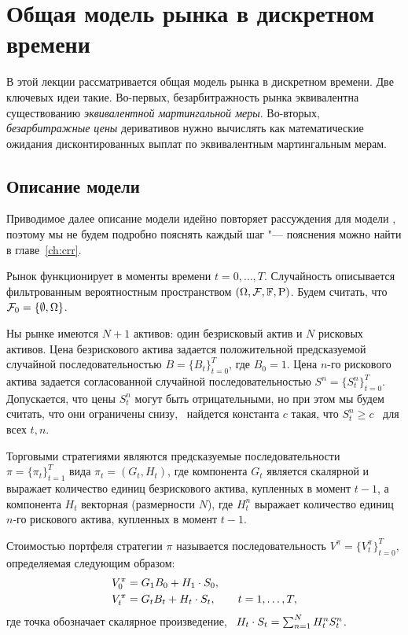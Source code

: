 \chapter{Общая модель рынка в дискретном времени}
\label{ch:general}
\chaptertoc

В этой лекции рассматривается общая модель рынка в дискретном времени.
Две ключевых идеи такие.
Во-первых, безарбитражность рынка эквивалентна существованию \emph{эквивалентной мартингальной меры}.
Во-вторых, \emph{безарбитражные цены} деривативов нужно вычислять как математические ожидания дисконтированных выплат по эквивалентным мартингальным мерам.


\section{Описание модели}

Приводимое далее описание модели идейно повторяет рассуждения для модели \crr, поэтому мы не будем подробно пояснять каждый шаг "--- пояснения можно найти в главе~\ref{ch:crr}.

Рынок функционирует в моменты времени $t=0,\dots,T$.
Случайность описывается фильтрованным вероятностным пространством $(\Omega,\mathcal{F},\mathbb{F},\mathrm{P})$.
Будем считать, что $\mathcal{F}_0 = \{\emptyset,\Omega\}$.

Ны рынке имеются $N+1$ активов: один безрисковый актив и $N$ рисковых активов.
Цена безрискового актива задается положительной предсказуемой случайной последовательностью $B=\{B_t\}_{t=0}^T$, где $B_0=1$.
Цена $n$-го рискового актива задается согласованной случайной последовательностью $S^n=\{S^n_t\}_{t=0}^T$.
Допускается, что цены $S_t^n$ могут быть отрицательными, но при этом мы будем считать, что они ограничены снизу, \te\ найдется константа $c$ такая, что $S_t^n\ge c$ \as\ для всех $t,n$.

Торговыми стратегиями являются предсказуемые последовательности $\pi = \{\pi_t\}_{t=1}^T$ вида $\pi_t=(G_t, H_t)$, где компонента $G_t$ является скалярной и выражает количество единиц безрискового актива, купленных в момент $t-1$, а компонента $H_t$ векторная (размерности $N$),    где $H_t^n$ выражает количество единиц $n$-го рискового актива, купленных в момент $t-1$. 

Стоимостью портфеля стратегии $\pi$ называется последовательность $V^\pi = \{V_t^\pi\}_{t=0}^T$, определяемая следующим образом:
\begin{align}
\label{gen:V0}
&V_0^\pi = G_1B_0 + {H_1}\cdot{S_0},\\
\label{gen:Vt}
&V_t^\pi =  G_tB_t + {H_t}\cdot{S_t},
  \qquad t=1,\dots,T,
\end{align}
где точка обозначает скалярное произведение, \te\ ${H_t}\cdot{S_t} = \sum_{n=1}^N H_t^nS_t^n$.

